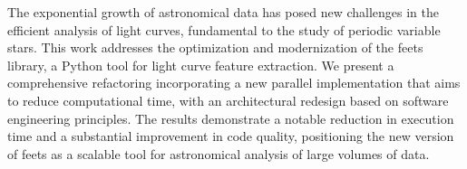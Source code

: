 The exponential growth of astronomical data has posed new challenges in the efficient analysis of light curves, fundamental to the study of periodic variable stars. This work addresses the optimization and modernization of the \acrfull{feets} library, a Python tool for light curve feature extraction. We present a comprehensive refactoring incorporating a new parallel implementation that aims to reduce computational time, with an architectural redesign based on software engineering principles. The results demonstrate a notable reduction in execution time and a substantial improvement in code quality, positioning the new version of \acrshort{feets} as a scalable tool for astronomical analysis of large volumes of data.